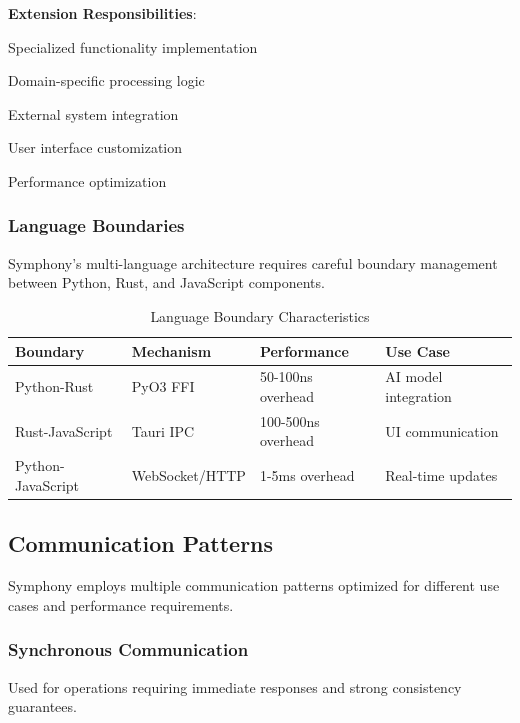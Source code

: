 \textbf{Extension Responsibilities}:
\begin{compactlist}
    \item Specialized functionality implementation
    \item Domain-specific processing logic
    \item External system integration
    \item User interface customization
    \item Performance optimization
\end{compactlist}

\subsubsection*{Language Boundaries}

Symphony's multi-language architecture requires careful boundary management between Python, Rust, and JavaScript components.

\begin{table}[h]
\centering
\caption{Language Boundary Characteristics}
\label{tab:language-boundaries}
\begin{tabular}{@{}llll@{}}
\toprule
\textbf{Boundary} & \textbf{Mechanism} & \textbf{Performance} & \textbf{Use Case} \\
\midrule
Python-Rust & PyO3 FFI & 50-100ns overhead & AI model integration \\
Rust-JavaScript & Tauri IPC & 100-500ns overhead & UI communication \\
Python-JavaScript & WebSocket/HTTP & 1-5ms overhead & Real-time updates \\
\bottomrule
\end{tabular}
\end{table}

\subsection*{Communication Patterns}

Symphony employs multiple communication patterns optimized for different use cases and performance requirements.

\subsubsection*{Synchronous Communication}

Used for operations requiring immediate responses and strong consistency guarantees.


